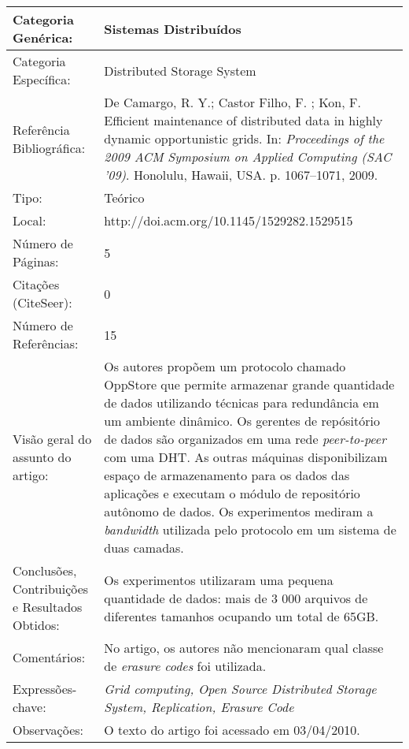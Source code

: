 \documentclass[10pt,a4paper]{article}
\begin{document}
\begin{center}
\begin{tabular}{|p{5cm}||p{10cm}|}
\hline

Categoria Genérica: & Sistemas Distribuídos\\\hline
Categoria Específica: & Distributed Storage System\\\hline
Referência Bibliográfica: & De Camargo, R. Y.; Castor Filho, F. ; Kon, F. Efficient maintenance of distributed data in highly dynamic opportunistic grids. In:  \emph{Proceedings of the 2009 ACM Symposium on Applied Computing (SAC '09)}. Honolulu, Hawaii, USA. p. 1067--1071, 2009.\\\hline
Tipo: & Teórico\\\hline
Local: & http://doi.acm.org/10.1145/1529282.1529515\\\hline
Número de Páginas: & 5\\\hline
Citações (CiteSeer): & 0\\\hline
Número de Referências: & 15\\\hline
Visão geral do assunto do artigo: & Os autores propõem um protocolo chamado OppStore que permite armazenar grande quantidade de dados utilizando técnicas para redundância em um ambiente dinâmico. Os gerentes de repósitório de dados são organizados em uma rede \emph{peer-to-peer} com uma DHT. As outras máquinas disponibilizam espaço de armazenamento para os dados das aplicações e executam o módulo de repositório autônomo de dados.  Os experimentos mediram a \emph{bandwidth} utilizada pelo protocolo em um sistema de duas camadas.\\\hline
Conclusões, Contribuições e Resultados Obtidos: & Os experimentos utilizaram uma pequena quantidade de dados: mais de 3 000 arquivos de diferentes tamanhos ocupando um total de 65GB.\\\hline
Comentários: & No artigo, os autores não mencionaram qual classe de \emph{erasure codes} foi utilizada.\\\hline
Expressões-chave: & \emph{Grid computing, Open Source Distributed Storage System, Replication, Erasure Code}\\\hline
Observações: &  O texto do artigo foi acessado em 03/04/2010.\\\hline

\end{tabular}
\end{center}
\end{document}
